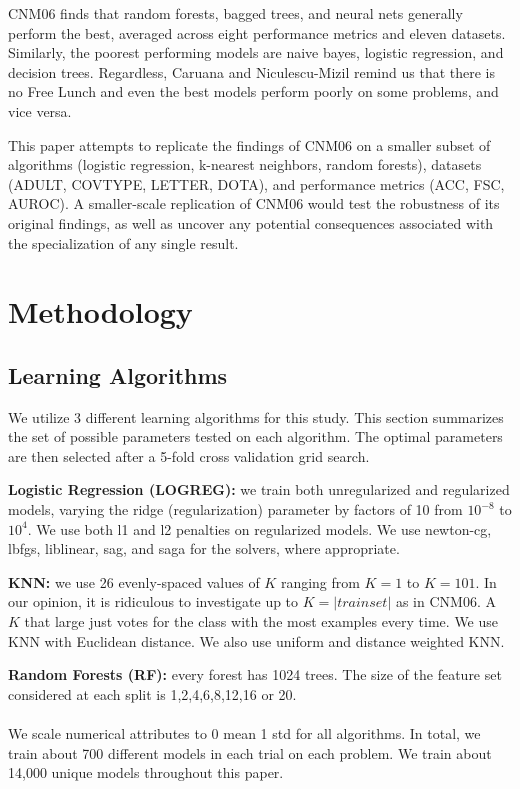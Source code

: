 \documentclass[twoside,11pt]{article}
\begin{document}
CNM06 finds that random forests, bagged trees, and neural nets generally perform the best, averaged across eight performance metrics and eleven datasets. Similarly, the poorest performing models are naive bayes, logistic regression, and decision trees. Regardless, Caruana and Niculescu-Mizil remind us that there is no Free Lunch and even the best models perform poorly on some problems, and vice versa.

This paper attempts to replicate the findings of CNM06 on a smaller subset of algorithms (logistic regression, k-nearest neighbors, random forests), datasets (ADULT, COVTYPE, LETTER, DOTA), and performance metrics (ACC, FSC, AUROC). A smaller-scale replication of CNM06 would test the robustness of its original findings, as well as uncover any potential consequences associated with the specialization of any single result.

\section{Methodology}
\subsection{Learning Algorithms}
We utilize 3 different learning algorithms for this study. This section summarizes the set of possible parameters tested on each algorithm. The optimal parameters are then selected after a 5-fold cross validation grid search.

{\bf Logistic Regression (LOGREG):} we train both unregularized and regularized models, varying the ridge (regularization) parameter by factors of 10 from $10^{-8}$ to $10^4$. We use both l1 and l2 penalties on regularized models. We use newton-cg, lbfgs, liblinear, sag, and saga for the solvers, where appropriate.

{\bf KNN:} we use 26 evenly-spaced values of $K$ ranging from $K = 1$ to $K = 101$. In our opinion, it is ridiculous to investigate up to $K = |trainset|$ as in CNM06. A $K$ that large just votes for the class with the most examples every time. We use KNN with Euclidean distance. We also use uniform and distance weighted KNN.

{\bf Random Forests (RF):} every forest has 1024 trees. The size of the feature set considered at each split is 1,2,4,6,8,12,16 or 20.\\
\\
We scale numerical attributes to 0 mean 1 std for all algorithms. In total, we train about 700 different models in each trial on each problem. We train about 14,000 unique models throughout this paper.
\end{document}
